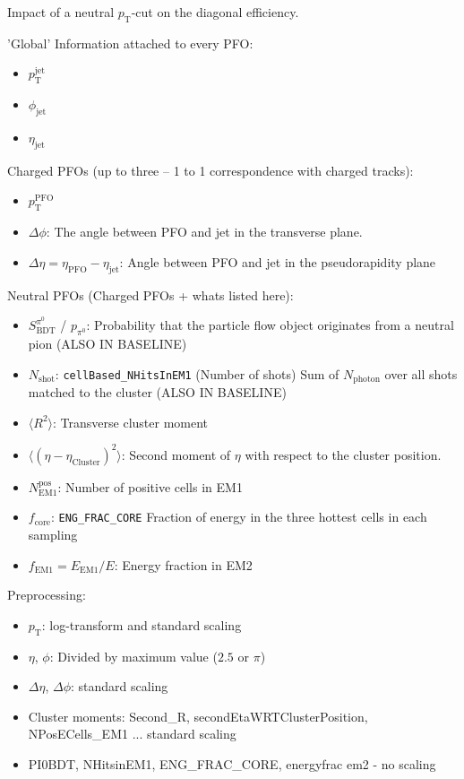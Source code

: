 \begin{table}[ht]
  \centering
  
  \caption{Impact of a neutral $p_\text{T}$-cut on the diagonal efficiency.}
  \label{tab:neut_ptcut}
\end{table}



'Global' Information attached to every PFO:
\begin{itemize}
\item $p_\text{T}^\text{jet}$
\item $\phi_\text{jet}$
\item $\eta_\text{jet}$
\end{itemize}

Charged PFOs (up to three -- 1 to 1 correspondence with charged tracks):
\begin{itemize}
\item $p_\text{T}^\text{PFO}$
\item $\Delta \phi$: The angle between PFO and jet in the transverse plane.
\item $\Delta \eta = \eta_\text{PFO} - \eta_\text{jet}$: Angle between PFO and
  jet in the pseudorapidity plane
\end{itemize}

Neutral PFOs (Charged PFOs + whats listed here):
\begin{itemize}
\item $S_\text{BDT}^{\pi^0}$ / $p_{\pi^0}$: Probability that the particle flow
  object originates from a neutral pion (ALSO IN BASELINE)
\item $N_\text{shot}$: \texttt{cellBased\_NHitsInEM1} (Number of shots) Sum of
  $N_\text{photon}$ over all shots matched to the cluster (ALSO IN BASELINE)
\item $\langle R^2 \rangle$: Transverse cluster moment
\item $\langle (\eta - \eta_\text{Cluster})^2 \rangle$: Second moment of $\eta$
  with respect to the cluster position.
\item $N_\text{EM1}^\text{pos}$: Number of positive cells in EM1
\item $f_\text{core}$: \texttt{ENG\_FRAC\_CORE} Fraction of energy in the three
  hottest cells in each sampling 
\item $f_\text{EM1} = E_\text{EM1} / E$: Energy fraction in EM2
\end{itemize}

Preprocessing:
\begin{itemize}
\item $p_\text{T}$: log-transform and standard scaling
\item $\eta$, $\phi$: Divided by maximum value ($2.5$ or $\pi$)
\item $\Delta \eta$, $\Delta \phi$: standard scaling
\item Cluster moments: Second\_R, secondEtaWRTClusterPosition, NPosECells\_EM1
  ... standard scaling
\item PI0BDT, NHitsinEM1, ENG\_FRAC\_CORE, energyfrac em2 - no scaling
\end{itemize}

